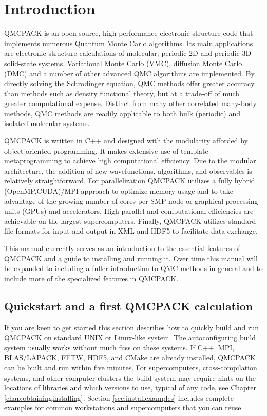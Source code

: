 \chapter{Introduction}
\label{chap:introduction}

QMCPACK is an open-source, high-performance electronic structure code
that implements numerous Quantum Monte Carlo algorithms. Its main
applications are electronic structure calculations of molecular,
periodic 2D and periodic 3D solid-state systems. Variational Monte
Carlo (VMC), diffusion Monte Carlo (DMC) and a number of other
advanced QMC algorithms are implemented. By directly solving the
Schrodinger equation, QMC methods offer greater accuracy than methods
such as density functional theory, but at a trade-off of much greater
computational expense. Distinct from many other correlated many-body
methods, QMC methods are readily applicable to both bulk
(periodic) and isolated molecular systems.

QMCPACK is written in C++ and designed with the modularity afforded by
object-oriented programming. It makes extensive use of template
metaprogramming to achieve high computational efficiency. Due to the
modular architecture, the addition of new wavefunctions, algorithms,
and observables is relatively straightforward. For parallelization
QMCPACK utilizes a fully hybrid (OpenMP,CUDA)/MPI approach to optimize
memory usage and to take advantage of the growing number of cores per
SMP node or graphical processing units (GPUs) and accelerators. High
parallel and computational efficiencies are achievable on the largest
supercomputers. Finally, QMCPACK utilizes standard file formats for
input and output in XML and HDF5 to facilitate data exchange.

This manual currently serves as an introduction to the essential features
of QMCPACK and a guide to installing and running it. Over time this
manual will be expanded to including a fuller introduction to QMC
methods in general and to include more of the specialized features in
QMCPACK.

\section{Quickstart and a first QMCPACK calculation}
If you are keen to get started this section describes how to quickly
build and run QMCPACK on standard UNIX or Linux-like system. The
autoconfiguring build system usually works without much fuss on these
systems.  If C++, MPI, BLAS/LAPACK, FFTW, HDF5, and CMake are already
installed, QMCPACK can be built and run within five minutes. For
supercomputers, cross-compilation systems, and other computer clusters
the build system may require hints on the locations of libraries and
which versions to use, typical of any code, see Chapter
\ref{chap:obtaininginstalling}. Section \ref{sec:installexamples}
includes complete examples for common workstations and supercomputers that you can reuse.

